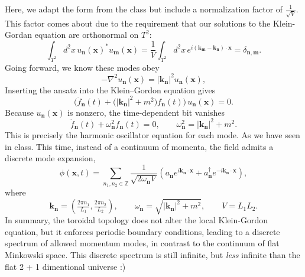 \documentclass[12pt]{article}
\begin{document}
Here, we adapt the form from the class but include a normalization factor of
$\frac{1}{\sqrt{V}}$. This factor comes about due to the requirement that our
solutions to the Klein-Gordan equation are orthonormal on $T^2$:
\[
\int_{T^2} d^2x\, u_{\mathbf n}(\mathbf x)^* u_{\mathbf m}(\mathbf x)
= \frac{1}{V}\int_{T^2} d^2x\, e^{i(\mathbf k_{\mathbf m}-\mathbf k_{\mathbf n})\cdot\mathbf x}
= \delta_{\mathbf n,\mathbf m}.
\]
Going forward, we know these modes obey
\begin{equation}
    -\nabla^2 u_{\mathbf{n}}(\mathbf{x})
    = |\mathbf{k}_{\mathbf{n}}|^2 u_{\mathbf{n}}(\mathbf{x}),
\end{equation}
Inserting the ansatz into the Klein--Gordon equation gives
\begin{equation}
    \bigl( \ddot f_{\mathbf{n}}(t)
    + \big(|\mathbf{k}_{\mathbf{n}}|^2 + m^2 \big) f_{\mathbf{n}}(t) \bigr)\,
    u_{\mathbf{n}}(\mathbf{x}) = 0.
\end{equation}
Because $u_{\mathbf{n}}(\mathbf{x})$ is nonzero, the time-dependent bit vanishes
\begin{equation}
    \ddot f_{\mathbf{n}}(t) + \omega_{\mathbf{n}}^2 f_{\mathbf{n}}(t) = 0,
    \qquad
    \omega_{\mathbf{n}}^2 = |\mathbf{k}_{\mathbf{n}}|^2 + m^2.
\end{equation}
This is precisely the harmonic oscillator equation for each mode. As we have
seen in class. This time, instead of a continuum of momenta, the field admits a
discrete mode
expansion,
\begin{equation}
    \phi(\mathbf{x},t) 
    = \sum_{n_1,n_2 \in \mathbb{Z}} 
    \frac{1}{\sqrt{2\omega_{\mathbf{n}} V}}
    \left( a_{\mathbf{n}} e^{i \mathbf{k}_{\mathbf{n}} \cdot \mathbf{x}}
    + a_{\mathbf{n}}^\dagger e^{- i \mathbf{k}_{\mathbf{n}} \cdot \mathbf{x}} \right),
\end{equation}
where
\begin{equation}
    \mathbf{k}_{\mathbf{n}} 
    = \left(\tfrac{2\pi n_1}{L_1}, \tfrac{2\pi n_2}{L_2}\right), 
    \qquad \omega_{\mathbf{n}} = \sqrt{|\mathbf{k}_{\mathbf{n}}|^2 + m^2}, 
    \qquad V = L_1 L_2.
\end{equation}
In summary, the toroidal topology does not alter the local Klein-Gordon
equation, but it enforces periodic boundary conditions, leading to a discrete
spectrum of allowed momentum modes, in contrast to the continuum of flat
Minkowski space. This discrete spectrum is still infinite, but \emph{less} 
infinite than the flat 2 + 1 dimentional universe :)
\end{document}
